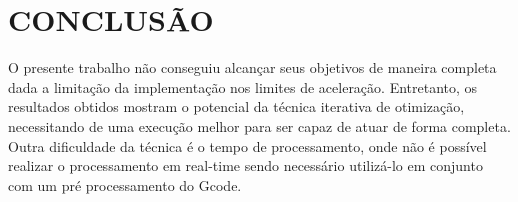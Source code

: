\chapter{CONCLUSÃO}
O presente trabalho não conseguiu alcançar seus objetivos 
de maneira completa dada a limitação da implementação nos 
limites de aceleração. Entretanto, os resultados obtidos 
mostram o potencial da técnica iterativa de otimização, 
necessitando de uma execução melhor para ser capaz de atuar 
de forma completa. Outra dificuldade da técnica é o tempo de 
processamento, onde não é possível realizar o processamento 
em real-time sendo necessário utilizá-lo em conjunto com um 
pré processamento do Gcode.
